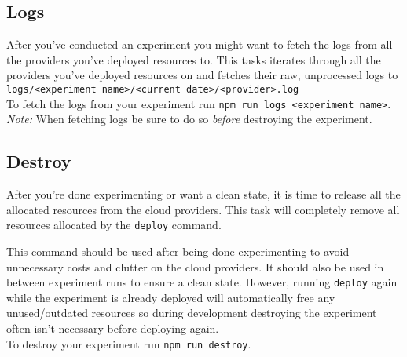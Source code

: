 \documentclass[../main.tex]{subfiles}
\begin{document}
\subsection{Logs}\label{sec:logs}
After you've conducted an experiment you might want to fetch the logs from all the providers you've deployed resources to. This tasks iterates through all the providers you've deployed resources on and fetches their raw, unprocessed logs to \texttt{logs/<experiment name>/<current date>/<provider>.log}\\
To fetch the logs from your experiment run \texttt{npm run logs <experiment name>}.\\
\textit{Note:} When fetching logs be sure to do so \textit{before} destroying the experiment.\\


\subsection{Destroy}\label{sec:destroy}
After you're done experimenting or want a clean state, it is time to release all the allocated resources from the cloud providers.
This task will completely remove all resources allocated by the \texttt{deploy} command. 

This command should be used after being done experimenting to avoid unnecessary costs and clutter on the cloud providers.
It should also be used in between experiment runs to ensure a clean state.
However, running \texttt{deploy} again while the experiment is already deployed will automatically free any unused/outdated resources so during development destroying the experiment often isn't necessary before deploying again.\\
To destroy your experiment run \texttt{npm run destroy}.\\
\end{document}
